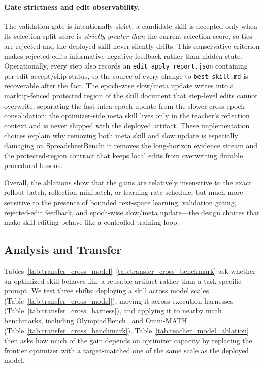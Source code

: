 \paragraph{Gate strictness and edit observability.}
The validation gate is intentionally strict: a candidate skill is accepted only when its selection-split score is \emph{strictly greater than} the current selection score, so ties are rejected and the deployed skill never silently drifts. This conservative criterion makes rejected edits informative negative feedback rather than hidden state. Operationally, every step also records an \texttt{edit\_apply\_report.json} containing per-edit accept/skip status, so the source of every change to \texttt{best\_skill.md} is recoverable after the fact. The epoch-wise slow/meta update writes into a markup-fenced protected region of the skill document that step-level edits cannot overwrite, separating the fast intra-epoch update from the slower cross-epoch consolidation; the optimizer-side meta skill lives only in the teacher's reflection context and is never shipped with the deployed artifact. These implementation choices explain why removing both meta skill and slow update is especially damaging on SpreadsheetBench: it removes the long-horizon evidence stream and the protected-region contract that keeps local edits from overwriting durable procedural lessons.

Overall, the ablations show that the gains are relatively insensitive to the exact rollout batch, reflection minibatch, or learning-rate schedule, but much more sensitive to the presence of bounded text-space learning, validation gating, rejected-edit feedback, and epoch-wise slow/meta update---the design choices that make skill editing behave like a controlled training loop.

\subsection{Analysis and Transfer}
\label{sec:analysis_transfer}

Tables~\ref{tab:transfer_cross_model}--\ref{tab:transfer_cross_benchmark} ask whether an optimized skill behaves like a reusable artifact rather than a task-specific prompt. We test three shifts: deploying a skill across model scales (Table~\ref{tab:transfer_cross_model}), moving it across execution harnesses (Table~\ref{tab:transfer_cross_harness}), and applying it to nearby math benchmarks, including OlympiadBench~\citep{he2024olympiadbench} and Omni-MATH~\citep{gao2024omnimathuniversalolympiadlevel} (Table~\ref{tab:transfer_cross_benchmark}). Table~\ref{tab:teacher_model_ablation} then asks how much of the gain depends on optimizer capacity by replacing the frontier optimizer with a target-matched one of the same scale as the deployed model.

